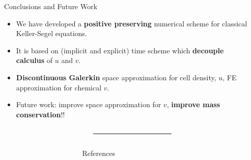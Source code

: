 \documentclass[final]{beamer}
\newlength{\sepmargin}
\newlength{\sepwid}
\newlength{\onecolwid}
\begin{document}
\begin{frame}[t]
\begin{columns}[t]
\begin{column}{\onecolwid}
      \begin{block}{Conclusions and Future Work}
        \small
        \begin{itemize}
        \item We have developed a \textbf{positive preserving} numerical scheme for classical Keller-Segel equations.
        \item It is based on (implicit and explicit) time scheme which \textbf{decouple calculus} of $u$ and $v$.
        \item \textbf{Discontinuous Galerkin} space approximation for cell density, $u$, FE approximation for chemical $v$.
        \item Future work: improve space approximation for $v$, \textbf{improve mass conservation}!!
        \end{itemize}
      \end{block}

    \end{column}

    \begin{column}{\sepmargin} \end{column}
  \end{columns}


  \vspace*{0.5cm}
  \begin{columns}[t]
    \begin{column}{\sepmargin}\end{column}
    \begin{column}{0.97\linewidth}
      {\color{blueMUW}\rule{1.012\textwidth}{10pt}}
    \end{column}
    \begin{column}{\sepmargin}\end{column}
  \end{columns}

  \vspace*{-1cm}
  \begin{columns}[t] %

    \begin{column}{\sepmargin} \end{column}
    \begin{column}{\onecolwid}
      \begin{block}{\large References}
        \vspace*{-0.5cm}
        \nocite{*} %
        {\footnotesize
          }
      \end{block}
    \end{column} %
    \begin{column}{\sepwid}  \end{column}


\end{columns}
\end{frame}
\end{document}
